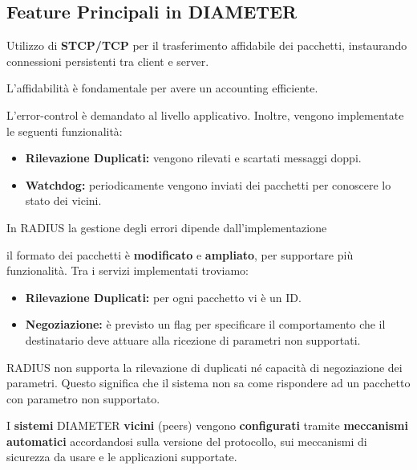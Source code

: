 \subsection{Feature Principali in DIAMETER}
\begin{proposition}
 Utilizzo di \textbf{STCP/TCP} per il trasferimento affidabile dei pacchetti, instaurando connessioni persistenti tra client e server.
\end{proposition}
\begin{remark}
    L'affidabilità è fondamentale per avere un accounting efficiente.
\end{remark}
\begin{proposition}
 L'error-control è demandato al livello applicativo. Inoltre, vengono implementate le seguenti funzionalità:
    \begin{itemize}
        \item \textbf{Rilevazione Duplicati:} vengono rilevati e scartati messaggi doppi.
        \item \textbf{Watchdog:} periodicamente vengono inviati dei pacchetti per conoscere lo stato dei vicini.
    \end{itemize}
\end{proposition}
\begin{remark}
    In RADIUS la gestione degli errori dipende dall'implementazione
\end{remark}
\begin{proposition}
il formato dei pacchetti è \textbf{modificato} e \textbf{ampliato}, per supportare più funzionalità. Tra i servizi implementati troviamo: 
    \begin{itemize}
         \item \textbf{Rilevazione Duplicati:} per ogni pacchetto vi è un ID.
        \item \textbf{Negoziazione:} è previsto un flag per specificare il comportamento che il destinatario deve attuare alla ricezione di parametri non supportati. 
    \end{itemize}
\end{proposition}
\begin{remark}
    RADIUS non supporta la rilevazione di duplicati né capacità di negoziazione dei parametri. Questo significa che il sistema non sa come rispondere ad un pacchetto con parametro non supportato.
\end{remark}
\begin{proposition}
I \textbf{sistemi} DIAMETER \textbf{vicini} (peers) vengono \textbf{configurati} tramite \textbf{meccanismi automatici} accordandosi sulla versione del protocollo, sui meccanismi di sicurezza da usare e le applicazioni supportate.
\end{proposition}
